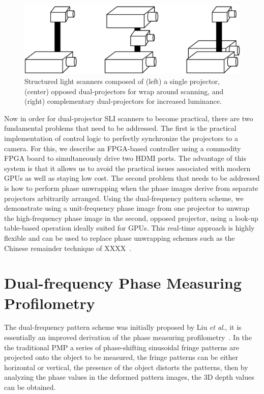 \documentclass[]{spie}  %
\begin{document}
\begin{figure}
\centerline{\includegraphics[width=5.0in]{Figures/Layouts}}
\vspace{0.1in}
\caption{Structured light scanners composed of (left) a single projector, (center) opposed dual-projectors for wrap around scanning, and (right) complementary dual-projectors for increased luminance.}
\label{Fig:10}
\end{figure} 

Now in order for dual-projector SLI scanners to become practical, there are two fundamental problems that need to be addressed.  The first is the practical implementation of control logic to perfectly synchronize the projectors to a camera.  For this, we describe an FPGA-based controller using a commodity FPGA board to simultaneously drive two HDMI ports.  The advantage of this system is that it allows us to avoid the practical issues associated with modern GPUs as well as staying low cost.  The second problem that needs to be addressed is how to perform phase unwrapping when the phase images derive from separate projectors arbitrarily arranged.  Using the dual-frequency pattern scheme, we demonstrate using a unit-frequency phase image from one projector to unwrap the high-frequency phase image in the second, opposed projector, using a look-up table-based operation ideally suited for GPUs. This real-time approach is highly flexible and can be used to replace phase unwrapping schemes such as the Chinese remainder technique of XXXX~\cite{??}.

\section{Dual-frequency Phase Measuring Profilometry}
The dual-frequency pattern scheme was initially proposed by Liu \textit{et al}.\cite{liuk10}, it is essentially  an improved derivation of the phase measuring profilometry~\cite{hali89}. In the the traditional PMP a series of phase-shifting sinusoidal fringe patterns are projected onto the object to be measured, the fringe patterns can be either horizontal or vertical, the presence of the object distorts the patterns, then by analyzing the phase values in the deformed pattern images, the 3D depth values can be obtained.
\end{document}
